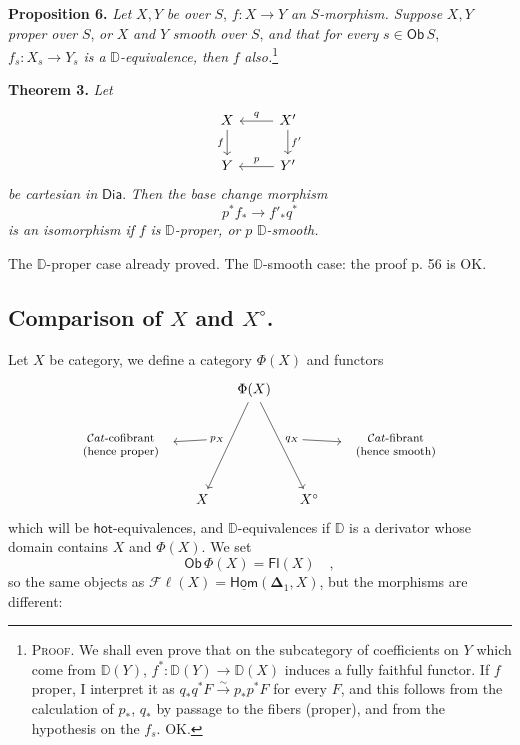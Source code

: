 \documentclass[11pt]{article}
\newcommand{\printedpage}[1]{\marginpar{\footnotesize p.~#1}}
\newcommand{\msp}[1]{\marginpar{\footnotesize [#1]}}
\newcommand{\D}{\mathbb{D}}
\newcommand{\Dia}{\mathsf{Dia}}
\newcommand{\Ob}{\mathsf{Ob}}
\newcommand{\Fl}{\mathsf{Fl}}
\newcommand{\Hom}{\underline{\mathsf{Hom}}}
\newcommand{\hot}{\mathsf{hot}}
\newcommand{\Cat}{\mathcal{C}at}
\begin{document}
\noindent\textbf{Proposition 6.} \textit{Let} $X, Y$ \textit{be over} $S$, $f : X \to Y$ \textit{an} $S$\textit{-morphism. Suppose} $X, Y$ \textit{proper over} $S$, \textit{or} $X$ \textit{and} $Y$ \textit{smooth over} $S$, \textit{and that for every} $s \in \Ob\, S$, $f_s : X_s \to Y_s$ \textit{is a} $\D$\textit{-equivalence, then} $f$ \textit{also.}\footnote[32]{\textsc{Proof}. We shall even prove that on the subcategory of coefficients on $Y$ which come from $\D(Y)$, $f^* : \D(Y) \to \D(X)$ induces a fully faithful functor. If $f$ proper, I interpret it as $q_*q^*F \overset{\sim}{\to} p_*p^*F$ for every $F$, and this follows from the calculation of $p_*$, $q_*$ by passage to the fibers (proper), and from the hypothesis on the $f_s$. OK.}

\msp{page 72}

\noindent\textbf{Theorem 3.} \textit{Let}
\[
\begin{tikzcd}
X \arrow[d, "f"{swap}] & X' \arrow[l, "q"{swap}] \arrow[d, "f'"] \\
Y & Y' \arrow[l, "p"{swap}]
\end{tikzcd}
\]
\textit{be cartesian in} $\Dia$. \textit{Then the base change morphism}
\[
p^*f_* \longrightarrow f'_*q^*
\]
\textit{is an isomorphism if} $f$ \textit{is} $\D$\textit{-proper, or} $p$ $\D$\textit{-smooth.}

\noindent The $\D$-proper case already proved. The $\D$-smooth case: the proof p. 56 is OK.

\printedpage{43}

\subsection*{Comparison of $X$ and $X^{\circ}$.}

Let $X$ be category, we define a category $\Phi(X)$ and functors
\[
\begin{tikzcd}[column sep=small]
& & \Phi(X) \arrow[ddl, "p_X"{swap, name=P}] \arrow[ddr, "q_X"{name=Q}] & & \\
|[alias=L]| \text{\footnotesize\begin{tabular}{c}$\Cat$-cofibrant\\(hence proper)\end{tabular}} & & & & |[alias=R]| \text{\footnotesize\begin{tabular}{c}$\Cat$-fibrant\\(hence smooth)\\ \end{tabular}} \\
& X & & X^{\circ} &
\arrow[from=P, to=L]
\arrow[from=Q, to=R]
\end{tikzcd}
\]
which will be $\hot$-equivalences, and $\D$-equivalences if $\D$ is a derivator whose domain contains $X$ and $\Phi(X)$. We set
\[
\Ob\, \Phi(X) = \Fl(X) \quad ,
\]
so the same objects as $\mathcal{F}\ell(X) = \Hom(\boldsymbol{\Delta}_1, X)$, but the morphisms are different:
\end{document}
